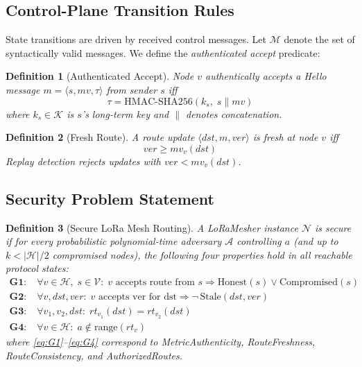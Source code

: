 \documentclass[10pt,journal,compsoc]{IEEEtran}
\newtheorem{definition}{Definition}
\begin{document}
\subsection{Control-Plane Transition Rules}

State transitions are driven by received control messages.
Let $\mathcal{M}$ denote the set of syntactically valid messages.
We define the \emph{authenticated accept} predicate:

\begin{definition}[Authenticated Accept]
Node $v$ \emph{authentically accepts} a Hello message
$m = \langle s, mv, \tau \rangle$ from sender $s$ iff
\begin{equation}
  \tau = \mathrm{HMAC\text{-}SHA256}(k_s,\; s \| mv)
  \label{eq:hmac-hello}
\end{equation}
where $k_s \in \mathcal{K}$ is $s$'s long-term key and
$\|$ denotes concatenation.
\end{definition}

\begin{definition}[Fresh Route]
A route update $\langle \mathit{dst}, m, \mathit{ver} \rangle$
is \emph{fresh} at node $v$ iff
\begin{equation}
  \mathit{ver} \geq mv_v(\mathit{dst})
  \label{eq:freshness}
\end{equation}
Replay detection rejects updates with $\mathit{ver} < mv_v(\mathit{dst})$.
\end{definition}

\subsection{Security Problem Statement}

\begin{definition}[Secure LoRa Mesh Routing]
A LoRaMesher instance $\mathcal{N}$ is \emph{secure} if for every
probabilistic polynomial-time adversary $\mathcal{A}$ controlling
$a$ (and up to $k < |\mathcal{H}|/2$ compromised nodes), the
following four properties hold in all reachable protocol states:
\begin{align}
  \textbf{G1:}&\; \forall v \in \mathcal{H},\; s \in \mathcal{V}:\;
    v\text{ accepts route from }s
    \Rightarrow \mathrm{Honest}(s) \vee \mathrm{Compromised}(s)
    \label{eq:G1} \\
  \textbf{G2:}&\; \forall v,\mathit{dst},\mathit{ver}:\;
    v\text{ accepts ver for dst}
    \Rightarrow \neg\, \mathrm{Stale}(\mathit{dst}, \mathit{ver})
    \label{eq:G2} \\
  \textbf{G3:}&\; \forall v_1, v_2,\mathit{dst}:\;
    rt_{v_1}(\mathit{dst}) = rt_{v_2}(\mathit{dst})
    \label{eq:G3} \\
  \textbf{G4:}&\; \forall v \in \mathcal{H}:\;
    a \notin \mathrm{range}(rt_v)
    \label{eq:G4}
\end{align}
where \eqref{eq:G1}--\eqref{eq:G4} correspond to
MetricAuthenticity, RouteFreshness, RouteConsistency, and
AuthorizedRoutes.
\end{definition}
\end{document}
